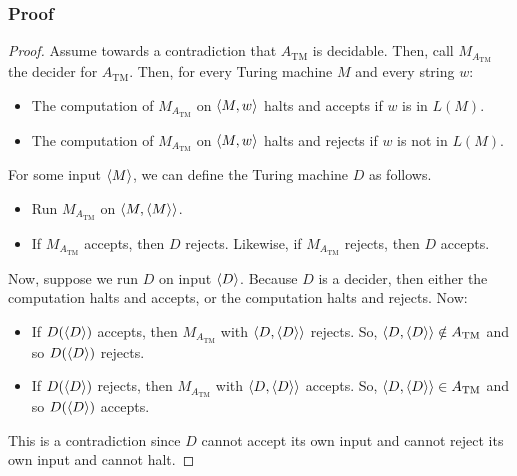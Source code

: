 \documentclass[letterpaper]{article}
\begin{document}
\subsubsection{Proof}
\begin{mdframed}[]
    \begin{proof}
        Assume towards a contradiction that $A_{\text{TM}}$ is decidable. Then, call $M_{A_{\text{TM}}}$ the decider for $A_{\text{TM}}$. Then, for every Turing machine $M$ and every string $w$: 
        \begin{itemize}
            \item The computation of $M_{A_{\text{TM}}}$ on $\langle M, w \rangle$ halts and accepts if $w$ is in $L(M)$. 
            \item The computation of $M_{A_{\text{TM}}}$ on $\langle M, w \rangle$ halts and rejects if $w$ is not in $L(M)$.
        \end{itemize}
        For some input $\langle M \rangle$, we can define the Turing machine $D$ as follows.
        \begin{itemize}
            \item Run $M_{A_{\text{TM}}}$ on $\langle M, \langle M \rangle \rangle$. 
            \item If $M_{A_{\text{TM}}}$ accepts, then $D$ rejects. Likewise, if $M_{A_{\text{TM}}}$ rejects, then $D$ accepts.
        \end{itemize}
        Now, suppose we run $D$ on input $\langle D \rangle$. Because $D$ is a decider, then either the computation halts and accepts, or the computation halts and rejects. Now: 
        \begin{itemize}
            \item If $D(\langle D \rangle)$ accepts, then $M_{A_{\text{TM}}}$ with $\langle D, \langle D \rangle \rangle$ rejects. So, $\langle D, \langle D \rangle \rangle \notin A_{\text{TM}}$ and so $D(\langle D \rangle)$ rejects.
            \item If $D(\langle D \rangle)$ rejects, then $M_{A_{\text{TM}}}$ with $\langle D, \langle D \rangle \rangle$ accepts. So, $\langle D, \langle D \rangle \rangle \in A_{\text{TM}}$ and so $D(\langle D \rangle)$ accepts.
        \end{itemize}
        This is a contradiction since $D$ cannot accept its own input and cannot reject its own input and cannot halt. 
    \end{proof}
\end{mdframed}
\end{document}
